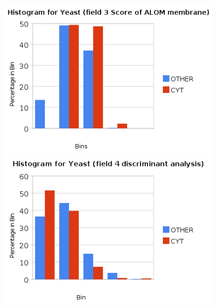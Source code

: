\documentclass[a4paper,10pt]{article}
\begin{document}
        \begin{figure}[ht!]
          \begin{minipage}[b]{0.5\linewidth}
            \includegraphics[scale=0.45]{charts/YeastPics/Y3.png}
          \end{minipage}
          \begin{minipage}[b]{0.5\linewidth}
             \includegraphics[scale=0.45]{charts/YeastPics/Y4.png}
          \end{minipage}
        \end{figure}
\end{document}

